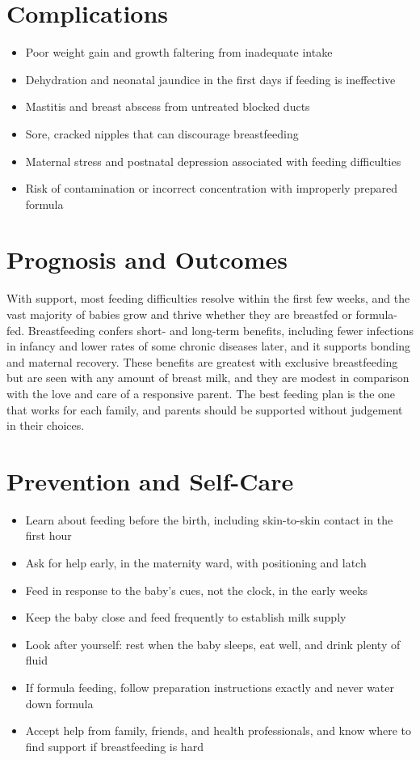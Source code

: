 \section*{Complications}
\begin{itemize}
    \item Poor weight gain and growth faltering from inadequate intake
    \item Dehydration and neonatal jaundice in the first days if feeding is ineffective
    \item Mastitis and breast abscess from untreated blocked ducts
    \item Sore, cracked nipples that can discourage breastfeeding
    \item Maternal stress and postnatal depression associated with feeding difficulties
    \item Risk of contamination or incorrect concentration with improperly prepared formula
\end{itemize}

\section*{Prognosis and Outcomes}
With support, most feeding difficulties resolve within the first few weeks, and the vast majority of babies grow and thrive whether they are breastfed or formula-fed. Breastfeeding confers short- and long-term benefits, including fewer infections in infancy and lower rates of some chronic diseases later, and it supports bonding and maternal recovery. These benefits are greatest with exclusive breastfeeding but are seen with any amount of breast milk, and they are modest in comparison with the love and care of a responsive parent. The best feeding plan is the one that works for each family, and parents should be supported without judgement in their choices.

\section*{Prevention and Self-Care}
\begin{itemize}
    \item Learn about feeding before the birth, including skin-to-skin contact in the first hour
    \item Ask for help early, in the maternity ward, with positioning and latch
    \item Feed in response to the baby's cues, not the clock, in the early weeks
    \item Keep the baby close and feed frequently to establish milk supply
    \item Look after yourself: rest when the baby sleeps, eat well, and drink plenty of fluid
    \item If formula feeding, follow preparation instructions exactly and never water down formula
    \item Accept help from family, friends, and health professionals, and know where to find support if breastfeeding is hard
\end{itemize}


